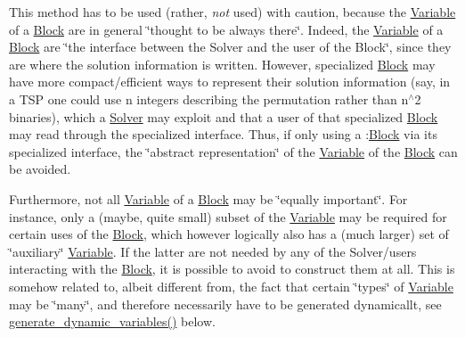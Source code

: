 This method has to be used (rather, {\itshape not} used) with caution, because the \mbox{\hyperlink{class_s_m_spp__di__unipi__it_1_1_variable}{Variable}} of a \mbox{\hyperlink{class_s_m_spp__di__unipi__it_1_1_block}{Block}} are in general \char`\"{}thought to be always there\char`\"{}. Indeed, the \mbox{\hyperlink{class_s_m_spp__di__unipi__it_1_1_variable}{Variable}} of a \mbox{\hyperlink{class_s_m_spp__di__unipi__it_1_1_block}{Block}} are \char`\"{}the interface between the Solver and the user
of the Block\char`\"{}, since they are where the solution information is written. However, specialized \mbox{\hyperlink{class_s_m_spp__di__unipi__it_1_1_block}{Block}} may have more compact/efficient ways to represent their solution information (say, in a T\+SP one could use n integers describing the permutation rather than n$^\wedge$2 binaries), which a \mbox{\hyperlink{class_s_m_spp__di__unipi__it_1_1_solver}{Solver}} may exploit and that a user of that specialized \mbox{\hyperlink{class_s_m_spp__di__unipi__it_1_1_block}{Block}} may read through the specialized interface. Thus, if only using a \+:\mbox{\hyperlink{class_s_m_spp__di__unipi__it_1_1_block}{Block}} via its specialized interface, the \char`\"{}abstract representation\char`\"{} of the \mbox{\hyperlink{class_s_m_spp__di__unipi__it_1_1_variable}{Variable}} of the \mbox{\hyperlink{class_s_m_spp__di__unipi__it_1_1_block}{Block}} can be avoided.

Furthermore, not all \mbox{\hyperlink{class_s_m_spp__di__unipi__it_1_1_variable}{Variable}} of a \mbox{\hyperlink{class_s_m_spp__di__unipi__it_1_1_block}{Block}} may be \char`\"{}equally important\char`\"{}. For instance, only a (maybe, quite small) subset of the \mbox{\hyperlink{class_s_m_spp__di__unipi__it_1_1_variable}{Variable}} may be required for certain uses of the \mbox{\hyperlink{class_s_m_spp__di__unipi__it_1_1_block}{Block}}, which however logically also has a (much larger) set of \char`\"{}auxiliary\char`\"{} \mbox{\hyperlink{class_s_m_spp__di__unipi__it_1_1_variable}{Variable}}. If the latter are not needed by any of the Solver/users interacting with the \mbox{\hyperlink{class_s_m_spp__di__unipi__it_1_1_block}{Block}}, it is possible to avoid to construct them at all. This is somehow related to, albeit different from, the fact that certain \char`\"{}types\char`\"{} of \mbox{\hyperlink{class_s_m_spp__di__unipi__it_1_1_variable}{Variable}} may be \char`\"{}many\char`\"{}, and therefore necessarily have to be generated dynamicallt, see \mbox{\hyperlink{class_s_m_spp__di__unipi__it_1_1_block_ab90d0f60518eee75370e29c95bae4522}{generate\+\_\+dynamic\+\_\+variables()}} below.

